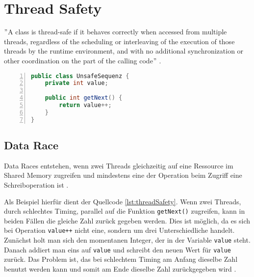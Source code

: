 \section{Thread Safety}\label{sec:threadSafety}

$"$A class is thread-safe if it behaves correctly when accessed from multiple threads, regardless of the scheduling or interleaving of the execution of those threads by the runtime environment, and with no additional synchronization or other coordination on the part of the calling code$"$ \cite[12]{brian}.\\ %

\begin{lstlisting}[language=Java,frame=tb,caption={Non-thread-safe Sequence Generator \cite{brian}}, label={lst:threadSafety}, numbers=left, stepnumber=1, captionpos=b]
public class UnsafeSequenz {
	private int value;

	public int getNext() {
		return value++;
	}
}
\end{lstlisting}

\subsection*{Data Race}

Data Races entstehen, wenn zwei Threads gleichzeitig auf eine Ressource im Shared Memory zugreifen und mindestens eine der Operation beim Zugriff eine Schreiboperation ist \cite[vgl.][72]{banerjee_theory_2006}. 

Als Beispiel hierfür dient der Quellcode \ref{lst:threadSafety}. Wenn zwei Threads, durch schlechtes Timing, parallel auf die Funktion \texttt{getNext()} zugreifen, kann in beiden Fällen die gleiche Zahl zurück gegeben werden. Dies ist möglich, da es sich bei Operation \texttt{value++} nicht eine, sondern um drei Unterschiedliche handelt. Zunächst holt man sich den momentanen Integer, der in der Variable \texttt{value} steht. Danach addiert man eins auf \texttt{value} und schreibt den neuen Wert für \texttt{value} zurück. Das Problem ist, das bei schlechtem Timing am Anfang dieselbe Zahl benutzt werden kann und somit am Ende dieselbe Zahl zurückgegeben wird \cite[vgl.][5]{brian}.

